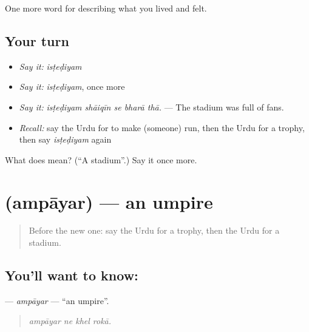 \begin{grammarlens}[title={What you've built}]
One more word for describing what you lived and felt.
\end{grammarlens}

\subsection*{Your turn}
\begin{itemize}
\raggedright
  \item \emph{Say it:} \emph{isṭeḍiyam}
  \item \emph{Say it:} \emph{isṭeḍiyam}, once more
  \item \emph{Say it:} \emph{isṭeḍiyam shāiqīn se bharā thā.} — The stadium was full of fans.
  \item \emph{Recall:} say the Urdu for to make (someone) run, then the Urdu for a trophy, then say \emph{isṭeḍiyam} again
\end{itemize}

\begin{tcolorbox}[breakable,colback=teal!4,colframe=teal!35!black,title={Before you move on}]
What does  mean? (\textquotedblleft{}A stadium\textquotedblright{}.) Say it once more.
\end{tcolorbox}
\section[\texorpdfstring{\ur{امپائر} (ampāyar)}{امپائر (ampāyar)}]{ (ampāyar) — an umpire}

\label{lesson:UR-C523-ampayar}



\begin{quote}
Before the new one: say the Urdu for a trophy, then the Urdu for a stadium.
\end{quote}

\subsection*{You'll want to know: }
\textbf{} — \emph{ampāyar} — \textquotedblleft{}an umpire\textquotedblright{}.

\begin{quote}
   
\end{quote}

\begin{quote}
\emph{ampāyar ne khel rokā.}
\end{quote}

